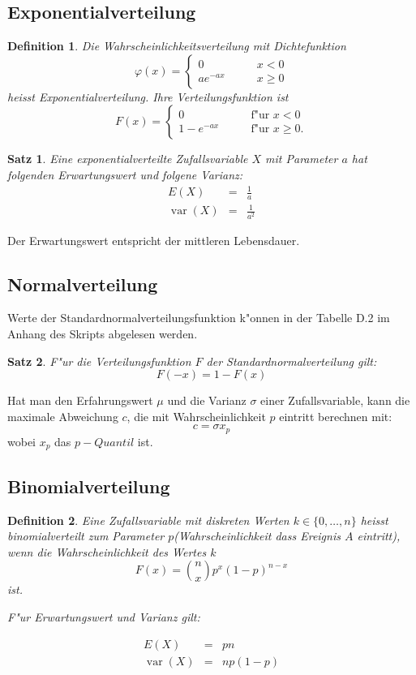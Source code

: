 \documentclass[ngerman, a4paper, 10pt, twocolumn, DIV20, headings=small]{scrartcl}
\newtheorem{definition}{Definition}
\newtheorem{satz}{Satz}
\begin{document}
\subsection{Exponentialverteilung}
\begin{definition}
Die Wahrscheinlichkeitsverteilung mit Dichtefunktion
\[
\varphi(x)=\begin{cases}
0&\qquad x<0\\
a e^{-a x}&\qquad x\ge 0
\end{cases}
\]
heisst Exponentialverteilung. Ihre Verteilungsfunktion ist
\[
F(x)=\begin{cases}
0&\qquad\text{f"ur $x < 0$}\\
1-e^{-ax}&\qquad\text{f"ur $x\ge 0$}.
\end{cases}
\]
\end{definition}

\begin{satz}Eine exponentialverteilte Zufallsvariable $X$ mit Parameter
$a$ hat folgenden Erwartungswert und folgene Varianz:
\begin{eqnarray*}
E(X)&=&\frac1a\\
\operatorname{var}(X)&=&\frac1{a^2}
\end{eqnarray*}
\end{satz}
Der Erwartungswert entspricht der mittleren Lebensdauer.

\subsection{Normalverteilung}
\label{sec:normalverteilung}

Werte der Standardnormalverteilungsfunktion k"onnen in der Tabelle D.2 im Anhang des Skripts abgelesen werden.

\begin{satz}
  F"ur die Verteilungsfunktion $F$ der Standardnormalverteilung gilt:
\[
F(-x) = 1 - F(x)
\]
\end{satz}

Hat man den Erfahrungswert $\mu$ und die Varianz $\sigma$ einer Zufallsvariable, kann die maximale Abweichung $c$, die mit Wahrscheinlichkeit $p$ eintritt berechnen mit:
\[
 c = \sigma x_p
\]
wobei $x_p$ das $p-Quantil$ ist.

\subsection{Binomialverteilung}
\label{sec:binomialverteilung}

\begin{definition}
Eine Zufallsvariable mit diskreten Werten $k\in\{0,\dots,n\}$
heisst binomialverteilt zum Parameter $p$(Wahrscheinlichkeit dass Ereignis $A$ eintritt), wenn die Wahrscheinlichkeit
des Wertes $k$ 
\[
F(x) = \binom{n}{x}p^x(1-p)^{n-x}
\]
ist.

F"ur Erwartungswert und Varianz gilt:

\begin{eqnarray*}
E(X)&=&pn\\
\operatorname{var}(X)&=& np(1-p)
\end{eqnarray*}
\end{definition}
\end{document}
